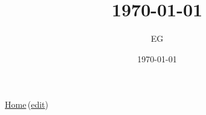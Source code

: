 \documentclass[12pt]{paper}
\title{ \today}
\author{EG}
\date{\today}
\newcommand{\wikilink}[2] { \href{#1.pdf}{#2}\,(\href{#1.tex}{edit})}
\begin{document}
 \maketitle
\wikilink{home}{Home}


 
\end{document}
